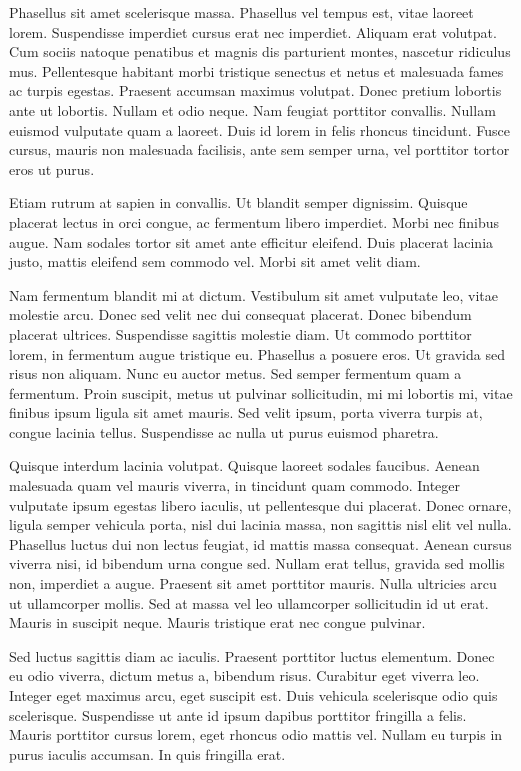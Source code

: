 Phasellus sit amet scelerisque massa. Phasellus vel tempus est, vitae laoreet lorem. Suspendisse imperdiet cursus erat nec imperdiet. Aliquam erat volutpat. Cum sociis natoque penatibus et magnis dis parturient montes, nascetur ridiculus mus. Pellentesque habitant morbi tristique senectus et netus et malesuada fames ac turpis egestas. Praesent accumsan maximus volutpat. Donec pretium lobortis ante ut lobortis. Nullam et odio neque. Nam feugiat porttitor convallis. Nullam euismod vulputate quam a laoreet. Duis id lorem in felis rhoncus tincidunt. Fusce cursus, mauris non malesuada facilisis, ante sem semper urna, vel porttitor tortor eros ut purus.

Etiam rutrum at sapien in convallis. Ut blandit semper dignissim. Quisque placerat lectus in orci congue, ac fermentum libero imperdiet. Morbi nec finibus augue. Nam sodales tortor sit amet ante efficitur eleifend. Duis placerat lacinia justo, mattis eleifend sem commodo vel. Morbi sit amet velit diam.

Nam fermentum blandit mi at dictum. Vestibulum sit amet vulputate leo, vitae molestie arcu. Donec sed velit nec dui consequat placerat. Donec bibendum placerat ultrices. Suspendisse sagittis molestie diam. Ut commodo porttitor lorem, in fermentum augue tristique eu. Phasellus a posuere eros. Ut gravida sed risus non aliquam. Nunc eu auctor metus. Sed semper fermentum quam a fermentum. Proin suscipit, metus ut pulvinar sollicitudin, mi mi lobortis mi, vitae finibus ipsum ligula sit amet mauris. Sed velit ipsum, porta viverra turpis at, congue lacinia tellus. Suspendisse ac nulla ut purus euismod pharetra.

Quisque interdum lacinia volutpat. Quisque laoreet sodales faucibus. Aenean malesuada quam vel mauris viverra, in tincidunt quam commodo. Integer vulputate ipsum egestas libero iaculis, ut pellentesque dui placerat. Donec ornare, ligula semper vehicula porta, nisl dui lacinia massa, non sagittis nisl elit vel nulla. Phasellus luctus dui non lectus feugiat, id mattis massa consequat. Aenean cursus viverra nisi, id bibendum urna congue sed. Nullam erat tellus, gravida sed mollis non, imperdiet a augue. Praesent sit amet porttitor mauris. Nulla ultricies arcu ut ullamcorper mollis. Sed at massa vel leo ullamcorper sollicitudin id ut erat. Mauris in suscipit neque. Mauris tristique erat nec congue pulvinar.

Sed luctus sagittis diam ac iaculis. Praesent porttitor luctus elementum. Donec eu odio viverra, dictum metus a, bibendum risus. Curabitur eget viverra leo. Integer eget maximus arcu, eget suscipit est. Duis vehicula scelerisque odio quis scelerisque. Suspendisse ut ante id ipsum dapibus porttitor fringilla a felis. Mauris porttitor cursus lorem, eget rhoncus odio mattis vel. Nullam eu turpis in purus iaculis accumsan. In quis fringilla erat.

